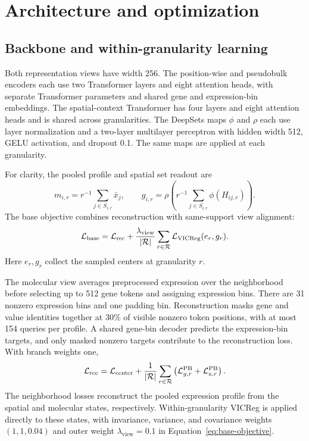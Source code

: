 \section{Architecture and optimization}
\label{app:hyperparameters}

\subsection{Backbone and within-granularity learning}

Both representation views have width 256. The position-wise and pseudobulk encoders each use two Transformer layers and eight attention heads, with separate Transformer parameters and shared gene and expression-bin embeddings. The spatial-context Transformer has four layers and eight attention heads and is shared across granularities. The DeepSets maps $\phi$ and $\rho$ each use layer normalization and a two-layer multilayer perceptron with hidden width 512, GELU activation, and dropout 0.1. The same maps are applied at each granularity.

For clarity, the pooled profile and spatial set readout are
\begin{equation}
m_{i,r}=r^{-1}\sum_{j\in S_{i,r}}\bar x_j,\qquad
 g_{i,r}=\rho\!\left(r^{-1}\sum_{j\in S_{i,r}}\phi(H_{ij,r})\right).
\label{eq:neighborhood-profile}
\end{equation}
The base objective combines reconstruction with same-support view alignment:
\begin{equation}
\mathcal L_{\mathrm{base}}=\mathcal L_{\mathrm{rec}}+
\frac{\lambda_{\mathrm{view}}}{|\mathcal{R}|}\sum_{r\in\mathcal{R}}\mathcal L_{\mathrm{VICReg}}(e_r,g_r).
\label{eq:base-objective}
\end{equation}
Here $e_r,g_r$ collect the sampled centers at granularity $r$.

The molecular view averages preprocessed expression over the neighborhood before selecting up to 512 gene tokens and assigning expression bins. There are 31 nonzero expression bins and one padding bin. Reconstruction masks gene and value identities together at 30\% of visible nonzero token positions, with at most 154 queries per profile. A shared gene-bin decoder predicts the expression-bin targets, and only masked nonzero targets contribute to the reconstruction loss. With branch weights one,
\begin{equation}
\mathcal L_{\mathrm{rec}}
=\mathcal L_{\mathrm{center}}
+\frac{1}{|\mathcal{R}|}\sum_{r\in\mathcal{R}}
\left(\mathcal L_{g,r}^{\mathrm{PB}}+\mathcal L_{e,r}^{\mathrm{PB}}\right).
\label{eq:reconstruction-objective}
\end{equation}
The neighborhood losses reconstruct the pooled expression profile from the spatial and molecular states, respectively. Within-granularity VICReg is applied directly to these states, with invariance, variance, and covariance weights $(1,1,0.04)$ and outer weight $\lambda_{\mathrm{view}}=0.1$ in Equation~\ref{eq:base-objective}.

